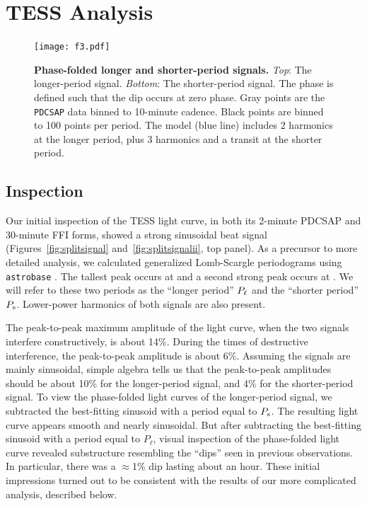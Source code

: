 \documentclass[12pt,twocolumn,tighten,trackchanges]{aastex62}
\begin{document}
\section{TESS Analysis}
\label{sec:tess}

\begin{figure}[t]
	\begin{center}
		\leavevmode
		\texttt{[image: f3.pdf]}
	\end{center}
	\vspace{-0.7cm}
	\caption{ {\bf Phase-folded longer and shorter-period signals.}
    {\it Top}: The longer-period signal.  {\it Bottom}: The
    shorter-period signal. The phase is defined such that the dip
    occurs at zero phase.  Gray points are the \texttt{PDCSAP} data
    binned to 10-minute cadence.  Black points are binned to 100
    points per period.  The model (blue line) includes 2 harmonics at
    the longer period, plus 3 harmonics and a transit at the shorter
    period.
		\label{fig:phasefold}
	}
\end{figure}

\subsection{Inspection}

Our initial inspection of the TESS light curve, in both its 2-minute
PDCSAP and 30-minute FFI forms, showed a strong sinusoidal beat signal
(Figures~\ref{fig:splitsignal} and~\ref{fig:splitsignalii}, top
panel). As a precursor to more detailed analysis, we calculated
generalized Lomb-Scargle periodograms using \texttt{astrobase}
\citep{lomb_1976,scargle_studies_1982,vanderplas_periodograms_2015,bhatti_astrobase_2018}.
The tallest peak occurs at  and a second strong peak occurs at
. We will refer to these
two periods as the ``longer period'' $P_{\rm \ell}$ and the ``shorter
period'' $P_{\rm s}$.  Lower-power harmonics of both signals are also
present.

The peak-to-peak maximum amplitude of the light curve, when the two
signals interfere constructively, is about 14\%.  During the times of
destructive interference, the peak-to-peak amplitude is about 6\%.
Assuming the signals are mainly sinusoidal, simple algebra tells us
that the peak-to-peak amplitudes should be about 10\% for the
longer-period signal, and 4\% for the shorter-period signal.  To view
the phase-folded light curves of the longer-period signal, we
subtracted the best-fitting sinusoid with a period equal to $P_{\rm
s}$. The resulting light curve appears smooth and nearly sinusoidal.
But after subtracting the best-fitting sinusoid with a period equal to
$P_{\ell}$, visual inspection of the phase-folded light curve revealed
substructure resembling the ``dips'' seen in previous observations. In
particular, there was a $\approx$1\% dip lasting about an hour.  These
initial impressions turned out to be consistent with the results of
our more complicated analysis, described below.
\end{document}
